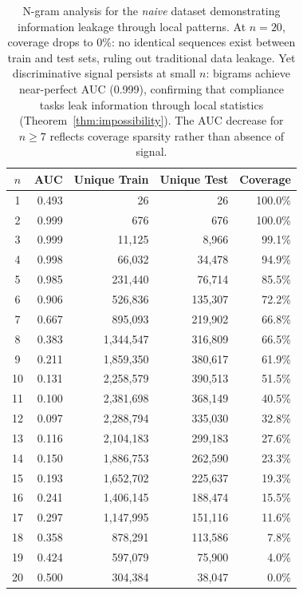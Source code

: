 \documentclass{article}
\theoremstyle{plain}
\theoremstyle{definition}
\theoremstyle{remark}
\begin{document}
\begin{table}[h]
\centering
\caption{N-gram analysis for the \textit{naive} dataset demonstrating information leakage through local patterns. At $n=20$, coverage drops to 0\%: no identical sequences exist between train and test sets, ruling out traditional data leakage. Yet discriminative signal persists at small $n$: bigrams achieve near-perfect AUC (0.999), confirming that compliance tasks leak information through local statistics (Theorem~\ref{thm:impossibility}). The AUC decrease for $n \geq 7$ reflects coverage sparsity rather than absence of signal.}
\label{tab:ngram_naive}
\small
\begin{tabular}{crrrr}
\toprule
$n$ & AUC & Unique Train & Unique Test & Coverage \\
\midrule
1 & 0.493 & 26 & 26 & 100.0\% \\
2 & 0.999 & 676 & 676 & 100.0\% \\
3 & 0.999 & 11,125 & 8,966 & 99.1\% \\
4 & 0.998 & 66,032 & 34,478 & 94.9\% \\
5 & 0.985 & 231,440 & 76,714 & 85.5\% \\
6 & 0.906 & 526,836 & 135,307 & 72.2\% \\
7 & 0.667 & 895,093 & 219,902 & 66.8\% \\
8 & 0.383 & 1,344,547 & 316,809 & 66.5\% \\
9 & 0.211 & 1,859,350 & 380,617 & 61.9\% \\
10 & 0.131 & 2,258,579 & 390,513 & 51.5\% \\
11 & 0.100 & 2,381,698 & 368,149 & 40.5\% \\
12 & 0.097 & 2,288,794 & 335,030 & 32.8\% \\
13 & 0.116 & 2,104,183 & 299,183 & 27.6\% \\
14 & 0.150 & 1,886,753 & 262,590 & 23.3\% \\
15 & 0.193 & 1,652,702 & 225,637 & 19.3\% \\
16 & 0.241 & 1,406,145 & 188,474 & 15.5\% \\
17 & 0.297 & 1,147,995 & 151,116 & 11.6\% \\
18 & 0.358 & 878,291 & 113,586 & 7.8\% \\
19 & 0.424 & 597,079 & 75,900 & 4.0\% \\
20 & 0.500 & 304,384 & 38,047 & 0.0\% \\
\bottomrule
\end{tabular}
\end{table}
\end{document}
